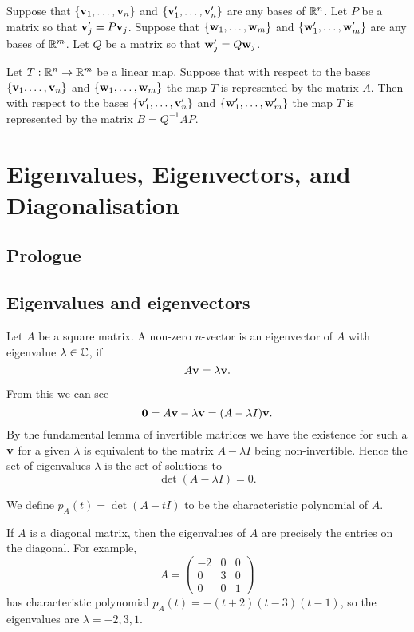 \documentclass[10pt, a4paper]{article}
\begin{document}
\begin{corollary}
    Suppose that $\{\mathbf{v}_1, \dotsc, \mathbf{v}_n\}$ and $\{\mathbf{v}'_1, \dotsc, \mathbf{v}'_n\}$ are any bases of $\mathbb{R} ^ n$.
    Let $P$ be a matrix so that $\mathbf{v}'_j = P\mathbf{v}_j$.
    Suppose that $\{\mathbf{w}_1, \dotsc, \mathbf{w}_m\}$ and $\{\mathbf{w}'_1, \dotsc, \mathbf{w}'_m\}$ are any bases of $\mathbb{R} ^ m$.
    Let $Q$ be a matrix so that $\mathbf{w}'_j = Q\mathbf{w}_j$.

    Let $T : \mathbb{R} ^ n \rightarrow \mathbb{R} ^ m$ be a linear map.
    Suppose that with respect to the bases $\{\mathbf{v}_1, \dotsc, \mathbf{v}_n\}$ and $\{\mathbf{w}_1, \dotsc, \mathbf{w}_m\}$ the map $T$ is represented by the matrix $A$.
    Then with respect to the bases $\{\mathbf{v}'_1, \dotsc, \mathbf{v}'_n\}$ and $\{\mathbf{w}'_1, \dotsc, \mathbf{w}'_m\}$ the map $T$ is represented by the matrix $B = Q ^ {-1}AP$.
\end{corollary}

\newpage

\section{Eigenvalues, Eigenvectors, and Diagonalisation}

\subsection{Prologue}

\subsection{Eigenvalues and eigenvectors}

\begin{definition}
    Let $A$ be a square matrix.
    A non-zero $n$-vector is an eigenvector of $A$ with eigenvalue $\lambda \in \mathbb{C}$,
    if
    \[
    A\mathbf{v} = \lambda\mathbf{v}.
    \]
\end{definition}
From this we can see
\[
\mathbf{0} = A\mathbf{v} - \lambda\mathbf{v} = (A - \lambda I)\mathbf{v}.
\]
By the fundamental lemma of invertible matrices we have the existence for such a $\mathbf{v}$ for a given $\lambda$ is equivalent to the matrix $A - \lambda I$ being non-invertible.
Hence the set of eigenvalues $\lambda$ is the set of solutions to
\[
\det(A - \lambda I) = 0.
\]

We define $p_A(t) = \det(A - tI)$ to be the characteristic polynomial of $A$.

\begin{example}
    If $A$ is a diagonal matrix,
    then the eigenvalues of $A$ are precisely the entries on the diagonal.
    For example,
    \[
    A = \begin{pmatrix}
        -2 & 0 & 0 \\
        0 & 3 & 0 \\
        0 & 0 & 1
    \end{pmatrix}
    \]
    has characteristic polynomial $p_A(t) = -(t + 2)(t - 3)(t - 1)$,
    so the eigenvalues are $\lambda = -2, 3, 1$.
\end{example}
\end{document}
